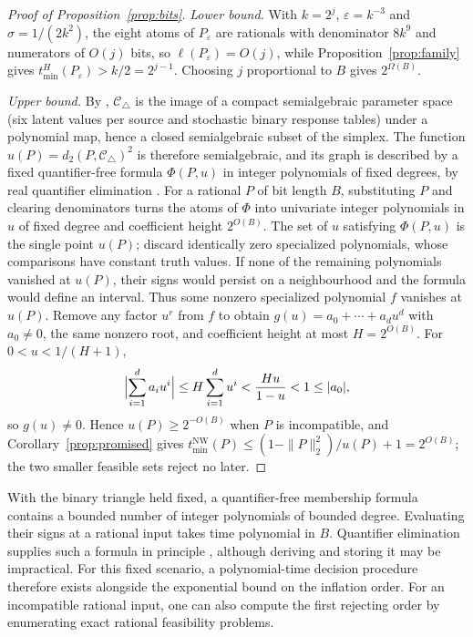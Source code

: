 \documentclass[11pt]{article}
\theoremstyle{plain}
\theoremstyle{definition}
\newcommand{\Ctri}{\mathcal C_{\triangle}}
\newcommand{\eps}{\varepsilon}
\newcommand{\tmin}{t_{\min}}
\begin{document}
\begin{proof}[Proof of Proposition~\ref{prop:bits}]
\emph{Lower bound.} With $k=2^j$, $\eps=k^{-3}$ and $\sigma=1/(2k^2)$, the eight atoms of $P_\eps$ are rationals with denominator $8k^9$ and numerators of $O(j)$ bits, so $\ell(P_\eps)=O(j)$, while Proposition~\ref{prop:family} gives $\tmin^H(P_\eps)>k/2=2^{j-1}$. Choosing $j$ proportional to $B$ gives $2^{\Omega(B)}$.

\emph{Upper bound.} By \cite{RGW2018}, $\Ctri$ is the image of a compact semialgebraic parameter space (six latent values per source and stochastic binary response tables) under a polynomial map, hence a closed semialgebraic subset of the simplex. The function $u(P)=d_2(P,\Ctri)^2$ is therefore semialgebraic, and its graph is described by a fixed quantifier-free formula $\Phi(P,u)$ in integer polynomials of fixed degrees, by real quantifier elimination \cite{BasuPollackRoy2006}. For a rational $P$ of bit length $B$, substituting $P$ and clearing denominators turns the atoms of $\Phi$ into univariate integer polynomials in $u$ of fixed degree and coefficient height $2^{O(B)}$. The set of $u$ satisfying $\Phi(P,u)$ is the single point $u(P)$; discard identically zero specialized polynomials, whose comparisons have constant truth values. If none of the remaining polynomials vanished at $u(P)$, their signs would persist on a neighbourhood and the formula would define an interval. Thus some nonzero specialized polynomial $f$ vanishes at $u(P)$. Remove any factor $u^r$ from $f$ to obtain $g(u)=a_0+\cdots+a_du^d$ with $a_0\ne0$, the same nonzero root, and coefficient height at most $H=2^{O(B)}$. For $0<u<1/(H+1)$,
\[
\Bigl|\sum_{i=1}^d a_i u^i\Bigr|\le H\sum_{i=1}^d u^i<\frac{Hu}{1-u}<1\le|a_0|,
\]
so $g(u)\ne0$. Hence $u(P)\ge2^{-O(B)}$ when $P$ is incompatible, and Corollary~\ref{prop:promised} gives $\tmin^{\mathrm{NW}}(P)\le(1-\|P\|_2^2)/u(P)+1=2^{O(B)}$; the two smaller feasible sets reject no later.
\end{proof}

With the binary triangle held fixed, a quantifier-free membership formula contains a bounded number of integer polynomials of bounded degree. Evaluating their signs at a rational input takes time polynomial in $B$. Quantifier elimination supplies such a formula in principle \cite{BasuPollackRoy2006}, although deriving and storing it may be impractical. For this fixed scenario, a polynomial-time decision procedure therefore exists alongside the exponential bound on the inflation order. For an incompatible rational input, one can also compute the first rejecting order by enumerating exact rational feasibility problems.
\end{document}
